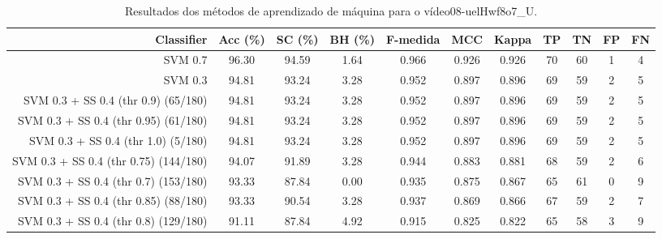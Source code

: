 \begin{table}[!htb]
\centering
\caption{Resultados dos métodos de aprendizado de máquina para o vídeo08-uelHwf8o7_U.}
\label{tab:08-uelHwf8o7_U}
\begin{tabular}{r|c|c|c|c|c|c|c|c|c|c}
\hline\hline
Classifier & Acc (\%) & SC (\%) & BH (\%) & F-medida & MCC & Kappa & TP & TN & FP & FN \\ \hline
SVM 0.7 & 96.30 & 94.59 & 1.64 & 0.966 & 0.926 & 0.926 & 70 & 60 & 1 & 4 \\ 
SVM 0.3 & 94.81 & 93.24 & 3.28 & 0.952 & 0.897 & 0.896 & 69 & 59 & 2 & 5 \\ 
SVM 0.3 + SS 0.4 (thr 0.9) (65/180) & 94.81 & 93.24 & 3.28 & 0.952 & 0.897 & 0.896 & 69 & 59 & 2 & 5 \\ 
SVM 0.3 + SS 0.4 (thr 0.95) (61/180) & 94.81 & 93.24 & 3.28 & 0.952 & 0.897 & 0.896 & 69 & 59 & 2 & 5 \\ 
SVM 0.3 + SS 0.4 (thr 1.0) (5/180) & 94.81 & 93.24 & 3.28 & 0.952 & 0.897 & 0.896 & 69 & 59 & 2 & 5 \\ 
SVM 0.3 + SS 0.4 (thr 0.75) (144/180) & 94.07 & 91.89 & 3.28 & 0.944 & 0.883 & 0.881 & 68 & 59 & 2 & 6 \\ 
SVM 0.3 + SS 0.4 (thr 0.7) (153/180) & 93.33 & 87.84 & 0.00 & 0.935 & 0.875 & 0.867 & 65 & 61 & 0 & 9 \\ 
SVM 0.3 + SS 0.4 (thr 0.85) (88/180) & 93.33 & 90.54 & 3.28 & 0.937 & 0.869 & 0.866 & 67 & 59 & 2 & 7 \\ 
SVM 0.3 + SS 0.4 (thr 0.8) (129/180) & 91.11 & 87.84 & 4.92 & 0.915 & 0.825 & 0.822 & 65 & 58 & 3 & 9 \\ 
\hline\hline
\end{tabular}
\end{table}
